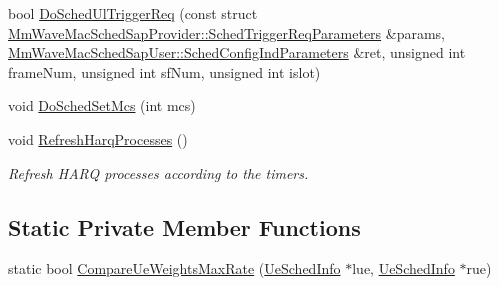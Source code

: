 \begin{DoxyCompactItemize}
\item 
bool \hyperlink{classns3_1_1MmWaveFlexTtiMaxRateMacScheduler_a3e26532658c6cfc260732109be70745d}{Do\+Sched\+Ul\+Trigger\+Req} (const struct \hyperlink{structns3_1_1MmWaveMacSchedSapProvider_1_1SchedTriggerReqParameters}{Mm\+Wave\+Mac\+Sched\+Sap\+Provider\+::\+Sched\+Trigger\+Req\+Parameters} \&params, \hyperlink{structns3_1_1MmWaveMacSchedSapUser_1_1SchedConfigIndParameters}{Mm\+Wave\+Mac\+Sched\+Sap\+User\+::\+Sched\+Config\+Ind\+Parameters} \&ret, unsigned int frame\+Num, unsigned int sf\+Num, unsigned int islot)
\item 
void \hyperlink{classns3_1_1MmWaveFlexTtiMaxRateMacScheduler_a688c03b3022f145505b8a7e519925e5d}{Do\+Sched\+Set\+Mcs} (int mcs)
\item 
void \hyperlink{classns3_1_1MmWaveFlexTtiMaxRateMacScheduler_ac0f9ee760cb2fd3ffefd101c2e6234cd}{Refresh\+Harq\+Processes} ()
\begin{DoxyCompactList}\small\item\em Refresh H\+A\+RQ processes according to the timers. \end{DoxyCompactList}\end{DoxyCompactItemize}
\subsection*{Static Private Member Functions}
\begin{DoxyCompactItemize}
\item 
static bool \hyperlink{classns3_1_1MmWaveFlexTtiMaxRateMacScheduler_a360f08fb3c9a2d9f9858b2bd76a89320}{Compare\+Ue\+Weights\+Max\+Rate} (\hyperlink{structns3_1_1MmWaveFlexTtiMaxRateMacScheduler_1_1UeSchedInfo}{Ue\+Sched\+Info} $\ast$lue, \hyperlink{structns3_1_1MmWaveFlexTtiMaxRateMacScheduler_1_1UeSchedInfo}{Ue\+Sched\+Info} $\ast$rue)
\end{DoxyCompactItemize}
